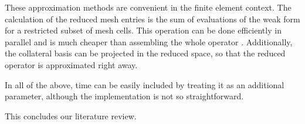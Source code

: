 These approximation methods are convenient in the finite element context.
The calculation of the reduced mesh entries is the sum of evaluations of the 
weak form for a restricted subset of mesh cells.
This operation can be done efficiently in parallel and 
is much cheaper than assembling the whole operator 
\cite{Santo_Manzoni_2019}.
Additionally, the collateral basis can be projected in the reduced space,
so that the reduced operator is approximated right away. 

In all of the above, 
time can be easily included by treating it as an additional parameter,
although the implementation is not so straightforward. 

This concludes our literature review.





